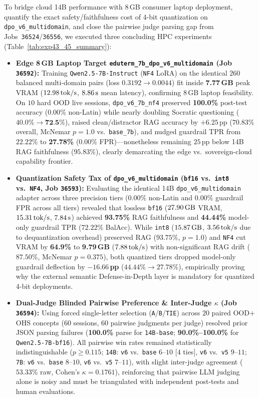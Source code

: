 \documentclass[a4paper,12pt]{report}
\begin{document}
To bridge cloud 14B performance with 8\,GB consumer laptop deployment, quantify the exact safety/faithfulness cost of 4-bit quantization on \texttt{dpo\_v6\_multidomain}, and close the pairwise judge parsing gap from Jobs~\texttt{36524}/\texttt{36556}, we executed three concluding HPC experiments (Table~\ref{tab:exp43_45_summary}):
\begin{itemize}
    \item \textbf{Edge 8\,GB Laptop Target \texttt{eduterm\_7b\_dpo\_v6\_multidomain} (Job \texttt{36592}):} Training \texttt{Qwen2.5-7B-Instruct} (\texttt{NF4} LoRA) on the identical $260$ balanced multi-domain pairs (loss $0.3192 \to 0.0044$) fit inside \textbf{7.77\,GB} peak VRAM ($12.98\text{\,tok/s}$, $8.86\text{\,s}$ mean latency), confirming 8\,GB laptop feasibility. On $10$ hard OOD live sessions, \texttt{dpo\_v6\_7b\_nf4} preserved \textbf{100.0\%} post-test accuracy ($0.00\%$ non-Latin) while nearly doubling Socratic questioning ($40.0\% \to \textbf{72.5\%}$), raised clean/distractor RAG accuracy by $+6.25$\,pp ($70.83\%$ overall, McNemar $p=1.0$ vs.\ \texttt{base\_7b}), and nudged guardrail TPR from $22.22\%$ to \textbf{27.78\%} ($0.00\%$ FPR)---nonetheless remaining $25$\,pp below 14B RAG faithfulness ($95.83\%$), clearly demarcating the edge vs.\ sovereign-cloud capability frontier.
    \item \textbf{Quantization Safety Tax of \texttt{dpo\_v6\_multidomain} (\texttt{bf16} vs.\ \texttt{int8} vs.\ \texttt{NF4}, Job \texttt{36593}):} Evaluating the identical 14B \texttt{dpo\_v6\_multidomain} adapter across three precision tiers ($0.00\%$ non-Latin and $0.00\%$ guardrail FPR across all tiers) revealed that lossless \texttt{bf16} ($27.90\text{\,GB}$ VRAM, $15.31\text{\,tok/s}$, $7.84\text{\,s}$) achieved \textbf{93.75\%} RAG faithfulness and \textbf{44.44\%} model-only guardrail TPR ($72.22\%$ BalAcc). While \texttt{int8} ($15.87\text{\,GB}$, $3.56\text{\,tok/s}$ due to dequantization overhead) preserved RAG ($93.75\%$, $p=1.0$) and \texttt{NF4} cut VRAM by \textbf{64.9\%} to \textbf{9.79\,GB} ($7.88\text{\,tok/s}$) with non-significant RAG drift ($87.50\%$, McNemar $p=0.375$), both quantized tiers dropped model-only guardrail deflection by \textbf{$-16.66$\,pp} ($44.44\% \to 27.78\%$), empirically proving why the external semantic Defense-in-Depth layer is mandatory for quantized 4-bit deployments.
    \item \textbf{Dual-Judge Blinded Pairwise Preference \& Inter-Judge $\kappa$ (Job \texttt{36594}):} Using forced single-letter selection (\texttt{A}/\texttt{B}/\texttt{TIE}) across $20$ paired OOD$+$OHS concepts ($60$ sessions, $60$ pairwise judgments per judge) resolved prior JSON parsing failures (\textbf{100.0\%} parse for \texttt{14B-base}; \textbf{90.0\%--100.0\%} for \texttt{Qwen2.5-7B-bf16}). All pairwise win rates remained statistically indistinguishable ($p \ge 0.115$; \texttt{14B}: \texttt{v6} vs.\ \texttt{base} $6$--$10$ [$4$ ties], \texttt{v6} vs.\ \texttt{v5} $9$--$11$; \texttt{7B}: \texttt{v6} vs.\ \texttt{base} $8$--$10$, \texttt{v6} vs.\ \texttt{v5} $7$--$11$), with slight inter-judge agreement ($53.33\%$ raw, Cohen's $\kappa = \mathbf{0.1761}$), reinforcing that pairwise LLM judging alone is noisy and must be triangulated with independent post-tests and human evaluations.

\end{itemize}
\end{document}
